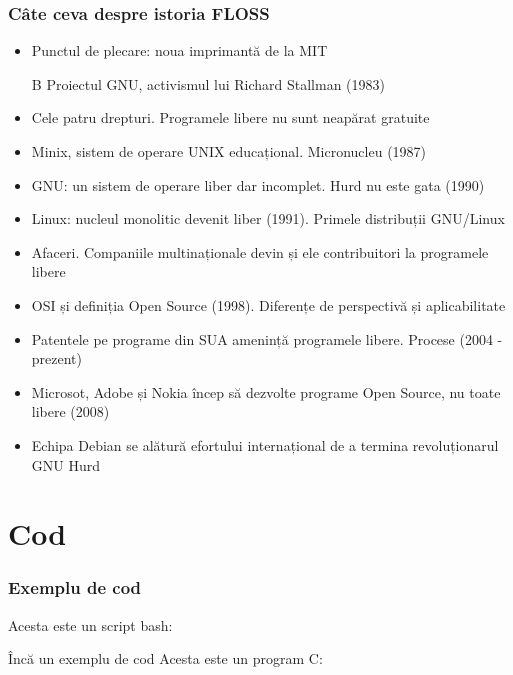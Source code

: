\documentclass{beamer}
\begin{document}
\begin{frame}[allowframebreaks] %
  \frametitle{Câte ceva despre istoria FLOSS}
  \begin{itemize}
  \item Punctul de plecare: noua imprimantă de la MIT
  \begin{block}{B}
  Proiectul GNU, activismul lui Richard Stallman (1983)
  \end{block}
  \item Cele patru drepturi. Programele libere nu sunt neapărat gratuite
  \item Minix, sistem de operare UNIX educațional. Micronucleu (1987)
  \item GNU: un sistem de operare liber dar incomplet. Hurd nu este gata (1990)
  \item Linux: nucleul monolitic devenit liber (1991). Primele distribuții
    GNU/Linux
  \item Afaceri. Companiile multinaționale devin și ele contribuitori la
    programele libere
  \item OSI și definiția Open Source (1998). Diferențe de perspectivă și
    aplicabilitate
  \item Patentele pe programe din SUA amenință programele libere. Procese (2004
    - prezent)
  \item Microsot, Adobe și Nokia încep să dezvolte programe Open Source, nu
    toate libere (2008)
  \item Echipa Debian se alătură efortului internațional de a termina
    revoluționarul GNU Hurd
  \end{itemize}
\end{frame}

\section{Cod}

\begin{frame}
  \frametitle{Exemplu de cod}
  Acesta este un script bash:\\
\end{frame}

\begin{frame}{Încă un exemplu de cod}
  Acesta este un program C:

  
\end{frame}
\end{document}
